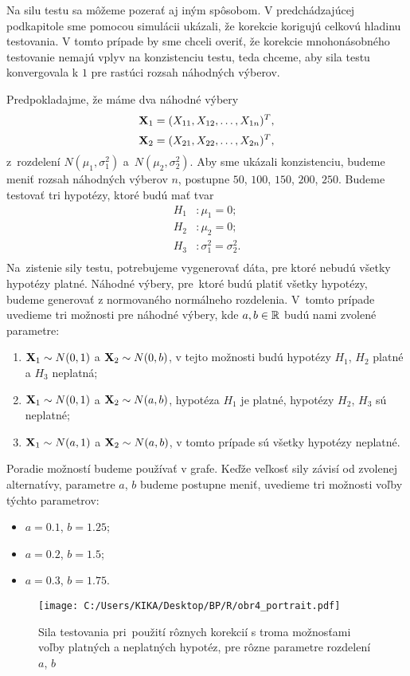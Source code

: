 Na silu testu sa môžeme pozerať aj iným spôsobom. 
V predchádzajúcej podkapitole sme pomocou simulácii ukázali, že korekcie korigujú celkovú hladinu testovania. 
V tomto prípade by sme chceli overiť, že korekcie mnohonásobného testovanie nemajú vplyv na konzistenciu testu, 
teda chceme, aby sila testu konvergovala k $1$ pre rastúci rozsah náhodných výberov. 

Predpokladajme, že máme dva náhodné výbery 
$$ {\bf X}_1 = (X_{11}, X_{12}, \dots, X_{1n})^T, $$ 
$$ {\bf X}_2 = (X_{21}, X_{22}, \dots, X_{2n})^T, $$
z~rozdelení $N(\mu_1, \sigma^2_1)$ a~$N(\mu_2, \sigma^2_2)$. 
Aby sme ukázali konzistenciu, budeme meniť rozsah náhodných výberov $n$, 
postupne $50$, $100$, $150$, $200$, $250$. 
Budeme testovať tri hypotézy, ktoré budú mať tvar 
\begin{align*}
  H_1 & : \mu_1 = 0; \\
  H_2 & : \mu_2 = 0; \\ 
  H_3 & : \sigma^2_1 = \sigma^2_2. \\
\end{align*}
Na~zistenie sily testu, potrebujeme vygenerovať dáta, pre ktoré nebudú všetky hypotézy platné. 
Náhodné výbery, pre~ktoré budú platiť všetky hypotézy, budeme generovať z normovaného normálneho rozdelenia. 
V~tomto prípade uvedieme tri možnosti pre náhodné výbery, kde $a, b \in \mathbb{R}$ budú nami zvolené parametre:  
\begin{enumerate}
  \item ${\bf X}_1 \sim N(0,1)$ a ${\bf X}_2 \sim N(0,b)$, 
  v tejto možnosti budú hypotézy $H_1$, $H_2$ platné a  $H_3$ neplatná; 
  \item ${\bf X}_1 \sim N(0,1)$ a ${\bf X}_2 \sim N(a,b)$,
  hypotéza $H_1$ je platné, hypotézy $H_2$, $H_3$ sú neplatné; 
  \item ${\bf X}_1 \sim N(a,1)$ a ${\bf X}_2 \sim N(a,b)$,  
  v tomto prípade sú všetky hypotézy neplatné.  
\end{enumerate}
Poradie možností budeme používať v grafe.  
Keďže veľkosť sily závisí od zvolenej alternatívy, parametre $a$, $b$ budeme postupne meniť, 
uvedieme tri možnosti voľby týchto parametrov: 
\begin{itemize}
  \item $a=0.1$, $b=1.25$;
  \item $a=0.2$, $b=1.5$;
  \item $a=0.3$, $b=1.75$.
\end{itemize}

\begin{figure}[h!]
  \centering
  \texttt{[image: C:/Users/KIKA/Desktop/BP/R/obr4\_portrait.pdf]}
  \caption{Sila testovania pri~použití rôznych korekcií 
  s troma možnosťami voľby platných a neplatných hypotéz, 
  pre rôzne parametre rozdelení $a$, $b$}
  \captionsetup{justification=centering}
  \label{obr04:2}
\end{figure}

